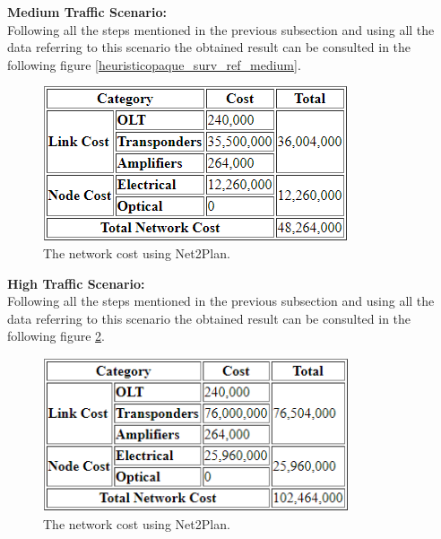 \textbf{Medium Traffic Scenario:}\\

Following all the steps mentioned in the previous subsection and using all the data referring to this scenario the obtained result can be consulted in the following figure \ref{heuristicopaque_surv_ref_medium}.

\begin{figure}[h!]
\centering
\includegraphics[width=9cm]{sdf/heuristic/figures/heuristic_opaque_surv_ref_medium}
\caption{The network cost using Net2Plan.}
\label{heuristicopaque_surv_ref_low}
\end{figure}


\textbf{High Traffic Scenario:}\\

Following all the steps mentioned in the previous subsection and using all the data referring to this scenario the obtained result can be consulted in the following figure \ref{heuristicopaque_surv_ref_high}.

\begin{figure}[h!]
\centering
\includegraphics[width=9cm]{sdf/heuristic/figures/heuristic_opaque_surv_ref_high}
\caption{The network cost using Net2Plan.}
\label{heuristicopaque_surv_ref_high}
\end{figure}
